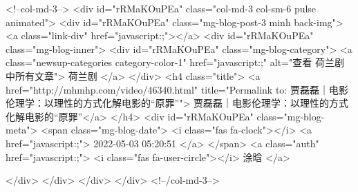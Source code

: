                         <!--col-md-3-->
                        <div id="rRMaKOuPEa"  class="col-md-3 col-sm-6 pulse animated">
                            <div id="rRMaKOuPEa"  class="mg-blog-post-3 minh back-img">
                                <a class="link-div" href="javascript:;"></a>
                                <div id="rRMaKOuPEa"  class="mg-blog-inner">
                                    <div id="rRMaKOuPEa"  class="mg-blog-category">
                                        <a class="newsup-categories category-color-1" href="javascript:;" alt="查看 荷兰剧 中所有文章">
                                            荷兰剧
                                        </a>
                                    </div>
                                    <h4 class="title"> <a href="http://mhmhp.com/video/46340.html" title="Permalink to: 贾磊磊｜电影伦理学：以理性的方式化解电影的“原罪”"> 贾磊磊｜电影伦理学：以理性的方式化解电影的“原罪”</a> </h4>
                                    <div id="rRMaKOuPEa"  class="mg-blog-meta">
                                        <span class="mg-blog-date">
                                            <i class="fas fa-clock"></i>
                                            <a href="javascript:;">
                                                2022-05-03 05:20:51
                                            </a>
                                        </span>
                                        <a class="auth" href="javascript:;">
                                            <i class="fas fa-user-circle"></i>
                                            涂晗
                                        </a>

                                    </div>
                                </div>
                            </div>
                        </div>
                        <!--/col-md-3-->
                        
